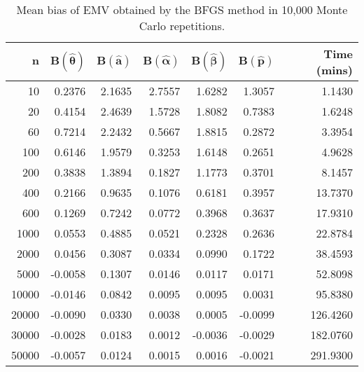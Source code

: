 \documentclass[12pt]{article}
\begin{document}
\thispagestyle{empty}
\begin{table}[ht]
\centering
\caption{Mean bias of EMV obtained by the BFGS method in 10,000 Monte Carlo repetitions.} 
\begin{tabular}{rrrrrrr}
  \hline
 $\bm n$ & $\bm B(\bm \hat{\bm \theta})$ & $\bm B(\bm \hat{\bm a})$ & $\bm B(\bm \hat{\bm \alpha})$ & $\bm B(\bm \hat{\bm \beta})$ & $\bm B(\bm \hat{\bm p})$ & \textbf{Time (mins)}\\ 
  \hline
10 & 0.2376 & 2.1635 & 2.7557 & 1.6282 & 1.3057 & 1.1430\\ 
20 & 0.4154 & 2.4639 & 1.5728 & 1.8082 & 0.7383 & 1.6248\\ 
60 & 0.7214 & 2.2432 & 0.5667 & 1.8815 & 0.2872 & 3.3954\\ 
100 & 0.6146 & 1.9579 & 0.3253 & 1.6148 & 0.2651 & 4.9628\\ 
200 & 0.3838 & 1.3894 & 0.1827 & 1.1773 & 0.3701 & 8.1457\\ 
400 & 0.2166 & 0.9635 & 0.1076 & 0.6181 & 0.3957 & 13.7370\\ 
600 & 0.1269 & 0.7242 & 0.0772 & 0.3968 & 0.3637 & 17.9310\\ 
1000 & 0.0553 & 0.4885 & 0.0521 & 0.2328 & 0.2636 & 22.8784 \\
2000  &  0.0456 & 0.3087 &  0.0334 &  0.0990 & 0.1722 &  38.4593\\
5000 & -0.0058 & 0.1307 & 0.0146 & 0.0117 & 0.0171 & 52.8098\\ 
10000 & -0.0146 & 0.0842 & 0.0095 & 0.0095 & 0.0031 & 95.8380\\ 
 20000 & -0.0090 & 0.0330 & 0.0038 & 0.0005 & -0.0099 & 126.4260\\ 
 30000 & -0.0028 & 0.0183 & 0.0012 & -0.0036 & -0.0029 & 182.0760\\ 
 50000 & -0.0057 & 0.0124 & 0.0015 & 0.0016 & -0.0021 & 291.9300\\ 
   \hline
\end{tabular}
\end{table}
\end{document}
